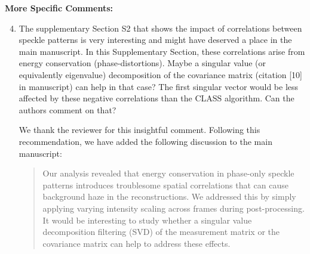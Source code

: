 \documentclass[12pt]{article}
\newcommand{\hlred}[1]{\sethlcolor{red!30}\hl{#1}}
\newenvironment{solved_reviewercomment}
    {\begin{tcolorbox}[width=\linewidth,colback=gray!5,colframe=solved_commentcolor!50,title=Reviewer Comment,left=5pt,right=5pt]}
    {\end{tcolorbox}}
\newenvironment{ourresponse}
    {\begin{tcolorbox}[width=\linewidth,breakable,enhanced,colback=gray!5,colframe=responsecolor!50,title=Response,left=5pt,right=5pt]}
    {\end{tcolorbox}}
\begin{document}
\textbf{More Specific Comments:}
\begin{enumerate}[label=\arabic*.]
    \setcounter{enumi}{3}
    \item  \leavevmode\vspace{-\baselineskip}
    \begin{solved_reviewercomment}
        The supplementary Section S2 that shows the impact of correlations between speckle patterns is very interesting and might have deserved a place in the main manuscript. In this Supplementary Section, these correlations arise from energy conservation (phase-distortions). Maybe a singular value (or equivalently eigenvalue) decomposition of the covariance matrix \cite{badon2020distortion}(citation [10] in manuscript) can help in that case? The first singular vector would be less affected by these negative correlations than the CLASS algorithm. Can the authors comment on that? 
    \end{solved_reviewercomment}
    \begin{ourresponse}

        

        We thank the reviewer for this insightful comment. Following this recommendation, we have added the following discussion to the main manuscript:
        
        \begin{quote}

            Our analysis revealed that energy conservation in phase-only speckle patterns introduces troublesome spatial correlations that can cause background haze in the reconstructions. We addressed this by simply applying varying intensity scaling across frames during post-processing. It would be interesting to study whether a singular value decomposition filtering (SVD) of the measurement matrix or the covariance matrix \cite{badon2020distortion,jo2022through} can help to address these effects.
            

\end{quote}
\end{ourresponse}
\end{enumerate}
\end{document}
